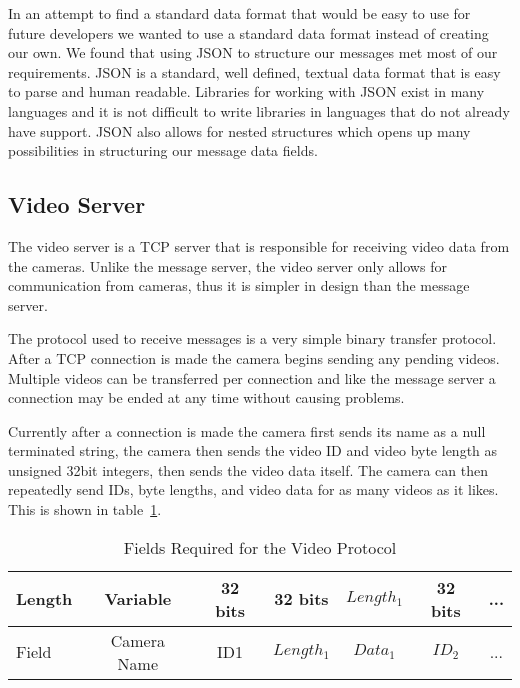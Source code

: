 In an attempt to find a standard data format that would be easy to use for
future developers we wanted to use a standard data format instead of creating
our own. We found that using JSON to structure our messages met most of our
requirements. JSON is a standard, well defined, textual data format that is easy
to parse and human readable. Libraries for working with JSON exist in many
languages and it is not difficult to write libraries in languages that do not
already have support. JSON also allows for nested structures which opens up many
possibilities in structuring our message data fields.


\subsection{Video Server}

The video server is a TCP server that is responsible for receiving video data
from the cameras. Unlike the message server, the video server only allows for
communication from cameras, thus it is simpler in design than the message
server.

The protocol used to receive messages is a very simple binary transfer protocol.
After a TCP connection is made the camera begins sending any pending videos.
Multiple videos can be transferred per connection and like the
message server a connection may be ended at any time without causing problems.

Currently after a connection is made the camera first sends its name as a null
terminated string, the camera then sends the video ID and video byte length as
unsigned 32bit integers, then sends the video data itself.  The camera can then
repeatedly send IDs, byte lengths, and video data for as many videos as it
likes. This is shown in table~\ref{video_protocol}.



\begin{table}[!t]
\renewcommand{\arraystretch}{1.3}
\caption{Fields Required for the Video Protocol}
\label{video_protocol}
\centering

\begin{tabular}{ | l || c | c | c | c | c | c |}
    \hline  
    Length & Variable & 32 bits & 32 bits & $Length_1$ & 32 bits & ...\\
    \hline                       
    Field & Camera Name & ID{1} & $Length_1$ & $Data_1$ & $ID_2$ & ...\\
    \hline  
\end{tabular}

\end{table}



